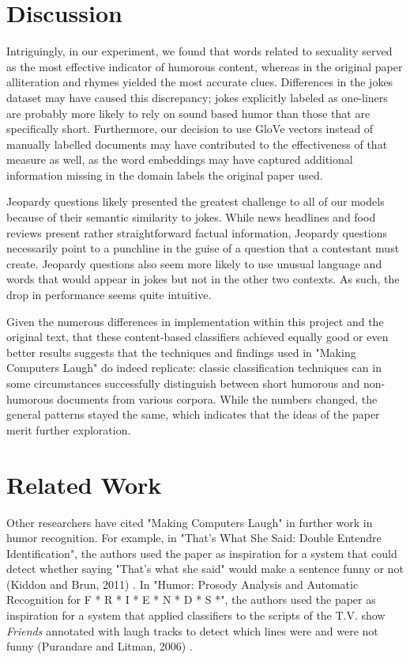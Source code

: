 \documentclass[11pt,a4paper]{article}
\begin{document}
\section{Discussion}
Intriguingly, in our experiment, we found that words related to sexuality served as the most effective indicator of humorous content, whereas in the original paper alliteration and rhymes yielded the most accurate clues. Differences in the jokes dataset may have caused this discrepancy; jokes explicitly labeled as one-liners are probably more likely to rely on sound based humor than those that are specifically short. Furthermore, our decision to use GloVe vectors instead of manually labelled documents may have contributed to the effectiveness of that measure as well, as the word embeddings may have captured additional information missing in the domain labels the original paper used.

Jeopardy questions likely presented the greatest challenge to all of our models because of their semantic similarity to jokes. While news headlines and food reviews present rather straightforward factual information, Jeopardy questions necessarily point to a punchline in the guise of a question that a contestant must create. Jeopardy questions also seem more likely to use unusual language and words that would appear in jokes but not in the other two contexts. As such, the drop in performance seems quite intuitive.

Given the numerous differences in implementation within this project and the original text, that these content-based classifiers achieved equally good or even better results suggests that the techniques and findings used in "Making Computers Laugh" do indeed replicate: classic classification techniques can in some circumstances successfully distinguish between short humorous and non-humorous documents from various corpora. While the numbers changed, the general patterns stayed the same, which indicates that the ideas of the paper merit further exploration.

\section{Related Work}

Other researchers have cited "Making Computers Laugh" in further work in humor recognition. For example, in "That's What She Said: Double Entendre Identification", the authors used the paper as inspiration for a system that could detect whether saying "That's what she said" would make a sentence funny or not (Kiddon and Brun, 2011) \cite{kiddon2011s}. In "Humor: Prosody Analysis and Automatic Recognition for F * R * I * E * N * D * S *", the authors used the paper as inspiration for a system that applied classifiers to the scripts of the T.V. show \emph{Friends} annotated with laugh tracks to detect which lines were and were not funny (Purandare and Litman, 2006) \cite{purandare2006humor}.
\end{document}
